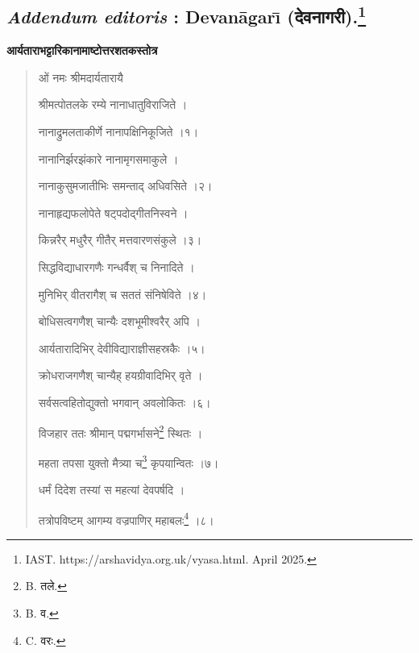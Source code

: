 \documentclass[a4paper, 11pt, oneside, french]{article}
\begin{document}
\subsection[\emph{Addendum editoris} : Devan\={a}gar\={\i} \texthindi{(देवनागरी)}.]{\emph{Addendum editoris} : Devan\={a}gar\={\i} \texthindi{(देवनागरी)}.\footnote{IAST. https://arshavidya.org.uk/vyasa.html. April 2025.}}
\begin{center}
\textbf{\texthindi{आर्यताराभट्टारिकानामाष्टोत्तरशतकस्तोत्र}}
\end{center}
\begin{quotation}
\texthindi{ओं नमः श्रीमदार्यतारायै}

\bigskip

\texthindi{श्रीमत्पोतलके रम्ये नानाधातुविराजिते ।}

\texthindi{नानाद्रुमलताकीर्णे नानापक्षिनिकूजिते ।१।}

\bigskip

\texthindi{नानानिर्झरझंकारे नानामृगसमाकुले ।}

\texthindi{नानाकुसुमजातीभिः समन्ताद् अधिवसिते ।२।}

\bigskip

\texthindi{नानाहृद्यफलोपेते षट्पदोद्गीतनिस्वने ।}

\texthindi{किन्नरैर् मधुरैर् गीतैर् मत्तवारणसंकुले ।३।}

\bigskip

\texthindi{सिद्धविद्याधारगणैः गन्धर्वैश् च निनादिते ।}

\texthindi{मुनिभिर् वीतरागैश् च सततं संनिषेविते ।४।}

\bigskip

\texthindi{बोधिसत्वगणैश् चान्यैः दशभूमीश्वरैर् अपि ।}

\texthindi{आर्यतारादिभिर् देवीविद्याराज्ञीसहस्रकैः ।५।}

\bigskip

\texthindi{क्रोधराजगणैश् चान्यैह् हयग्रीवादिभिर् वृते ।}

\texthindi{सर्वसत्वहितोद्युक्तो भगवान् अवलोकितः ।६।}

\bigskip

\texthindi{विजहार ततः श्रीमान् पद्मगर्भासने}\footnote{B. \texthindi{तले}.} \texthindi{स्थितः ।}

\texthindi{महता तपसा युक्तो मैत्र्या च}\footnote{B. \texthindi{व}.} \texthindi{कृपयान्वितः ।७।}

\bigskip

\texthindi{धर्मं दिदेश तस्यां स महत्यां देवपर्षदि ।}

\texthindi{तत्रोपविष्टम् आगम्य वज्रपाणिर् महाबलः}\footnote{C. \texthindi{वरः}.} \texthindi{।८।}


\end{quotation}
\end{document}
